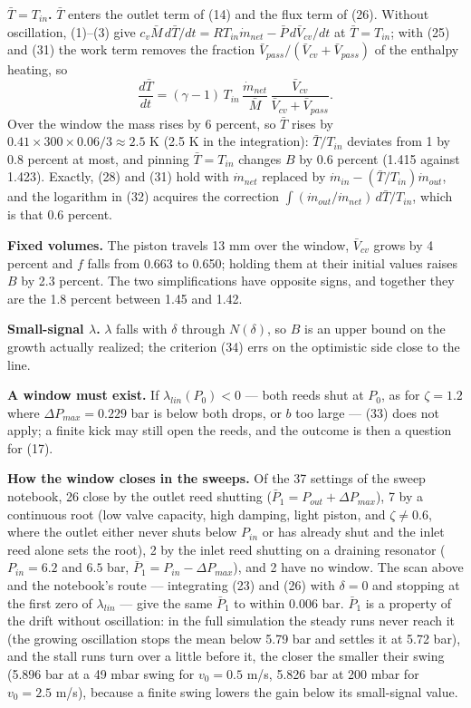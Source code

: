 \textbf{$\bar T = T_{in}$.} $\bar T$ enters the outlet term of (14) and the flux term of (26). Without oscillation, (1)--(3) give $c_v\bar M\,d\bar T/dt = R T_{in}\dot m_{net} - \bar P\,d\bar V_{cv}/dt$ at $\bar T = T_{in}$; with (25) and (31) the work term removes the fraction $\bar V_{pass}/(\bar V_{cv} + \bar V_{pass})$ of the enthalpy heating, so
\[
\frac{d\bar T}{dt} = (\gamma - 1)\,T_{in}\,\frac{\dot m_{net}}{\bar M}\,\frac{\bar V_{cv}}{\bar V_{cv} + \bar V_{pass}} .
\]
Over the window the mass rises by 6 percent, so $\bar T$ rises by $0.41\times300\times0.06/3 \approx 2.5$ K (2.5 K in the integration): $\bar T/T_{in}$ deviates from 1 by 0.8 percent at most, and pinning $\bar T = T_{in}$ changes $B$ by 0.6 percent (1.415 against 1.423). Exactly, (28) and (31) hold with $\dot m_{net}$ replaced by $\dot m_{in} - (\bar T/T_{in})\dot m_{out}$, and the logarithm in (32) acquires the correction $\int(\dot m_{out}/\dot m_{net})\,d\bar T/T_{in}$, which is that 0.6 percent.

\textbf{Fixed volumes.} The piston travels 13 mm over the window, $\bar V_{cv}$ grows by 4 percent and $f$ falls from 0.663 to 0.650; holding them at their initial values raises $B$ by 2.3 percent. The two simplifications have opposite signs, and together they are the 1.8 percent between 1.45 and 1.42.

\textbf{Small-signal $\lambda$.} $\lambda$ falls with $\delta$ through $N(\delta)$, so $B$ is an upper bound on the growth actually realized; the criterion (34) errs on the optimistic side close to the line.

\textbf{A window must exist.} If $\lambda_{lin}(P_0) < 0$ --- both reeds shut at $P_0$, as for $\zeta = 1.2$ where $\Delta P_{max} = 0.229$ bar is below both drops, or $b$ too large --- (33) does not apply; a finite kick may still open the reeds, and the outcome is then a question for (17).

\textbf{How the window closes in the sweeps.} Of the 37 settings of the sweep notebook, 26 close by the outlet reed shutting ($\bar P_1 = P_{out} + \Delta P_{max}$), 7 by a continuous root (low valve capacity, high damping, light piston, and $\zeta \ne 0.6$, where the outlet either never shuts below $P_{in}$ or has already shut and the inlet reed alone sets the root), 2 by the inlet reed shutting on a draining resonator ($P_{in} = 6.2$ and $6.5$ bar, $\bar P_1 = P_{in} - \Delta P_{max}$), and 2 have no window. The scan above and the notebook's route --- integrating (23) and (26) with $\delta = 0$ and stopping at the first zero of $\lambda_{lin}$ --- give the same $\bar P_1$ to within 0.006 bar. $\bar P_1$ is a property of the drift without oscillation: in the full simulation the steady runs never reach it (the growing oscillation stops the mean below 5.79 bar and settles it at 5.72 bar), and the stall runs turn over a little before it, the closer the smaller their swing (5.896 bar at a 49 mbar swing for $v_0 = 0.5$ m/s, 5.826 bar at 200 mbar for $v_0 = 2.5$ m/s), because a finite swing lowers the gain below its small-signal value.


